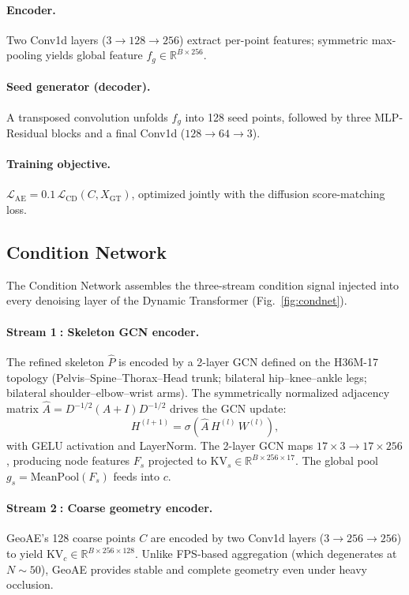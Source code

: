 \documentclass{article}
\newcommand{\Rbb}{\mathbb{R}}
\begin{document}
\paragraph{Encoder.}
Two Conv1d layers ($3\!\to\!128\!\to\!256$) extract per-point features;
symmetric max-pooling yields global feature $f_g\!\in\!\Rbb^{B\times256}$.

\paragraph{Seed generator (decoder).}
A transposed convolution unfolds $f_g$ into 128 seed points,
followed by three MLP-Residual blocks and a final Conv1d
($128\!\to\!64\!\to\!3$).

\paragraph{Training objective.}
$\mathcal{L}_\text{AE} = 0.1\,\mathcal{L}_\text{CD}(C, X_\text{GT})$,
optimized jointly with the diffusion score-matching loss.

\subsection{Condition Network}
\label{sec:condnet}

The Condition Network assembles the three-stream condition signal injected into
every denoising layer of the Dynamic Transformer (Fig.~\ref{fig:condnet}).

\paragraph{Stream \textcircled{1}: Skeleton GCN encoder.}
The refined skeleton $\hat{P}$ is encoded by a 2-layer GCN defined on the
H36M-17 topology (Pelvis--Spine--Thorax--Head trunk;
bilateral hip--knee--ankle legs; bilateral shoulder--elbow--wrist arms).
The symmetrically normalized adjacency matrix
$\hat{A} = D^{-1/2}(A+I)D^{-1/2}$ drives the GCN update:
\begin{equation}
  H^{(l+1)} = \sigma\!\left(\hat{A}\,H^{(l)}\,W^{(l)}\right),
\end{equation}
with GELU activation and LayerNorm.
The 2-layer GCN maps $17\!\times\!3\!\to\!17\!\times\!256$, producing node
features $F_s$ projected to $\mathrm{KV}_s\!\in\!\Rbb^{B\times256\times17}$.
The global pool $g_s\!=\!\mathrm{MeanPool}(F_s)$ feeds into $c$.

\paragraph{Stream \textcircled{2}: Coarse geometry encoder.}
GeoAE's 128 coarse points $C$ are encoded by two Conv1d layers
($3\!\to\!256\!\to\!256$) to yield
$\mathrm{KV}_c\!\in\!\Rbb^{B\times256\times128}$.
Unlike FPS-based aggregation (which degenerates at $N\!\sim\!50$),
GeoAE provides stable and complete geometry even under heavy occlusion.
\end{document}
